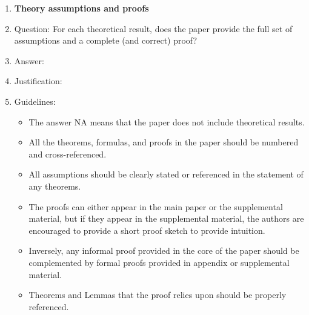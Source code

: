 \documentclass{article}
\begin{document}
\begin{enumerate}
\item {\bf Theory assumptions and proofs}
    \item[] Question: For each theoretical result, does the paper provide the full set of assumptions and a complete (and correct) proof?
    \item[] Answer: \answerTODO{} %
    \item[] Justification: \justificationTODO{}
    \item[] Guidelines:
    \begin{itemize}
        \item The answer NA means that the paper does not include theoretical results. 
        \item All the theorems, formulas, and proofs in the paper should be numbered and cross-referenced.
        \item All assumptions should be clearly stated or referenced in the statement of any theorems.
        \item The proofs can either appear in the main paper or the supplemental material, but if they appear in the supplemental material, the authors are encouraged to provide a short proof sketch to provide intuition. 
        \item Inversely, any informal proof provided in the core of the paper should be complemented by formal proofs provided in appendix or supplemental material.
        \item Theorems and Lemmas that the proof relies upon should be properly referenced. 
    \end{itemize}


\end{enumerate}
\end{document}
